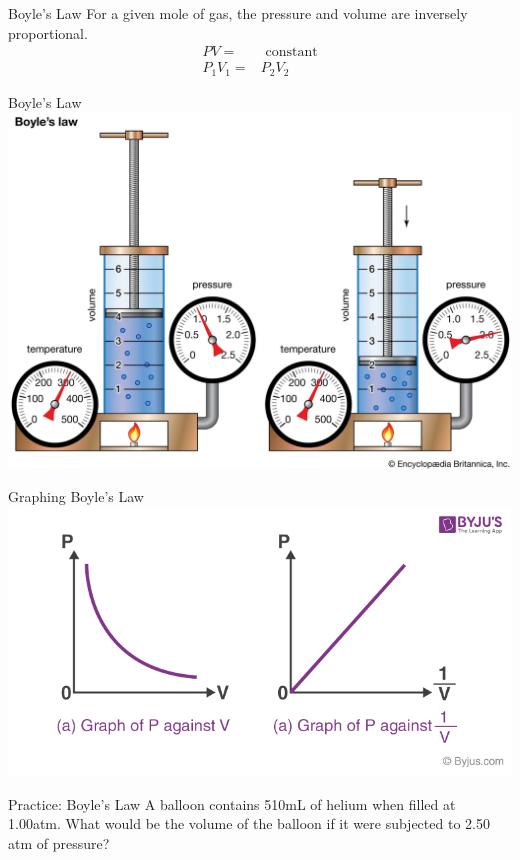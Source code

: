 \documentclass[11pt]{beamer}
\begin{document}
\begin{frame}{Boyle's Law}
  For a given mole of gas, the pressure and volume are inversely
  proportional.
  \begin{align}
    PV = & \text{ constant} \\
    P_1V_1 = & P_2V_2
  \end{align}    
\end{frame}

\begin{frame}{Boyle's Law}
  \centering
  \includegraphics[width=\linewidth]{boyle_law}
\end{frame}

\begin{frame}{Graphing Boyle's Law}
  \centering
  \includegraphics[width=0.9\linewidth]{boyle_graph}
\end{frame}

\begin{frame}{Practice: Boyle's Law}
  A balloon contains 510mL of helium when filled at 1.00atm. What would be
  the volume of the balloon if it were subjected to 2.50 atm of pressure?

  \vspace{1.5in}
\end{frame}
\end{document}

